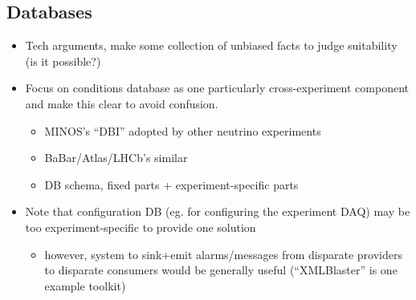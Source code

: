 \subsection{Databases}

\begin{itemize}
\item Tech arguments, make some collection of unbiased facts to judge suitability (is it possible?)
\item Focus on conditions database as one particularly cross-experiment component and make this clear to avoid confusion.
  \begin{itemize}
  \item MINOS's ``DBI'' adopted by other neutrino experiments
  \item BaBar/Atlas/LHCb's similar
  \item DB schema, fixed parts + experiment-specific parts
  \end{itemize}
\item Note that configuration DB (eg. for configuring the experiment DAQ) may be too experiment-specific to provide one solution
  \begin{itemize}
  \item however, system to sink+emit alarms/messages from disparate providers to disparate consumers would be generally useful (``XMLBlaster'' is one example toolkit)
  \end{itemize}
\end{itemize}

